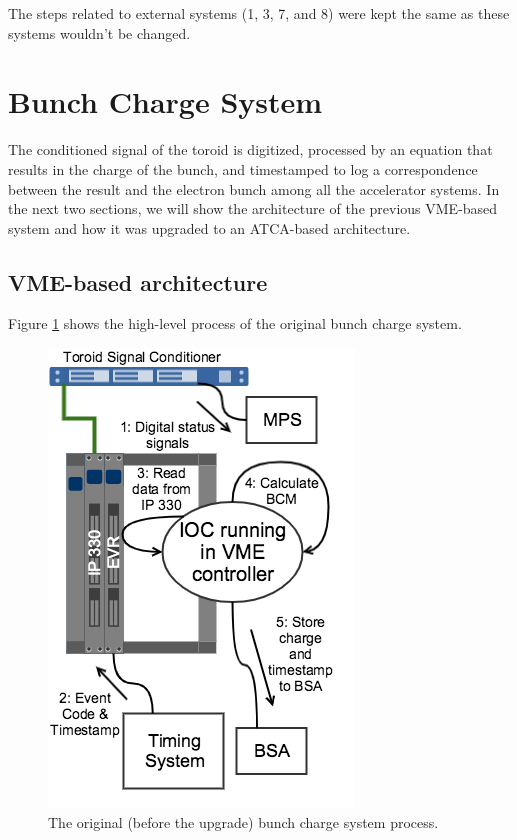 \documentclass[letter,
        biblatex,   %
        keeplastbox,  %
        ]{jacow}
\begin{document}
The steps related to external systems (1, 3, 7, and 8) were kept the same as these systems wouldn't be changed.

\section{Bunch Charge System}
The conditioned signal of the toroid is digitized, processed by an equation that results in the charge of the bunch, and timestamped to log a correspondence between the result and the electron bunch among all the accelerator systems. In the next two sections, we will show the architecture of the previous VME-based system and how it was upgraded to an ATCA-based architecture.

\subsection{VME-based architecture}
Figure \ref{fig:bcm_vme} shows the high-level process of the original bunch charge system.

\begin{figure}[!htb]
  \centering
  \includegraphics*[width=.8\columnwidth]{BCM_VME_Process}
  \caption{The original (before the upgrade) bunch charge system process.}
  \label{fig:bcm_vme}
\end{figure}
\end{document}
